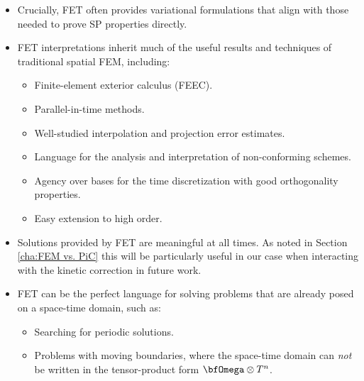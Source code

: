     \begin{itemize}
        \item  Crucially, FET often provides variational formulations that align with those needed to prove SP properties directly.
        \item  FET interpretations inherit much of the useful results and techniques of traditional spatial FEM, including:
        \begin{itemize}
            \item  Finite-element exterior calculus (FEEC).
            \item  Parallel-in-time methods.
            \item  Well-studied interpolation and projection error estimates.
            \item  Language for the analysis and interpretation of non-conforming schemes.
            \item  Agency over bases for the time discretization with good orthogonality properties.
            \item  Easy extension to high order.
        \end{itemize}
        \item  Solutions provided by FET are meaningful at all times. As noted in Section \ref{cha:FEM vs. PiC} this will be particularly useful in our case when interacting with the kinetic correction in future work.
        \item  FET can be the perfect language for solving problems that are already posed on a space-time domain, such as:
        \begin{itemize}
            \item  Searching for periodic solutions.
            \item  Problems with moving boundaries, where the space-time domain can \emph{not} be written in the tensor-product form $\bfOmega\otimes T^{n}$.
        \end{itemize}
    \end{itemize}
    
